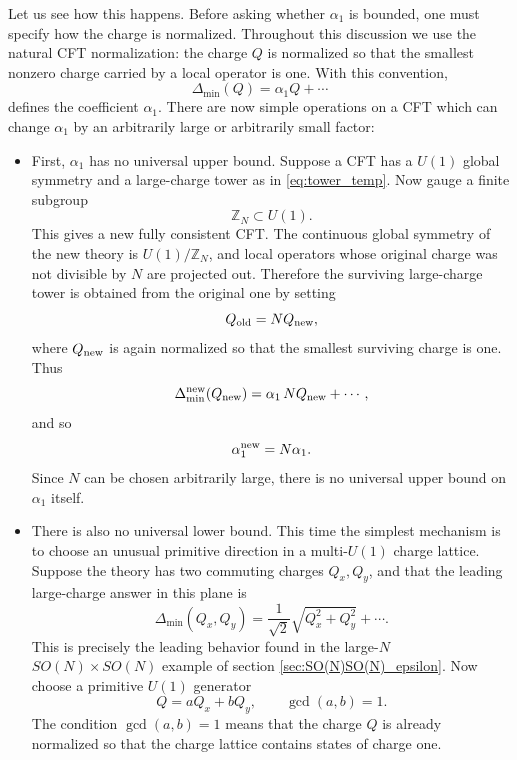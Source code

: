 \documentclass[a4paper,11pt]{article}
\begin{document}
Let us see how this happens. Before asking whether $\alpha_1$ is bounded, one must specify how the charge
is normalized. Throughout this discussion we use the natural CFT normalization: the charge $Q$ is normalized so that the smallest nonzero charge carried by a local operator is one. With this convention,
\begin{equation}\label{eq:tower_temp}
  \Delta_{\min}(Q)=\alpha_1 Q+\cdots
\end{equation}
defines the coefficient $\alpha_1$. There are now simple operations on a CFT which can change $\alpha_1$ by an arbitrarily large or arbitrarily small factor:
\begin{itemize}
    \item First, $\alpha_1$ has no universal upper bound. Suppose a CFT has a $U(1)$
global symmetry and a large-charge tower as in \eqref{eq:tower_temp}. Now gauge a finite subgroup
\begin{equation}
  \mathbb Z_N\subset U(1).
\end{equation}
This gives a new fully consistent CFT. The continuous global symmetry of the new theory is $U(1)/\mathbb Z_N$, and local operators whose original charge was not divisible by $N$ are projected out. Therefore the surviving large-charge tower is obtained from the original one by setting
\begin{equation}
  Q_{\rm old}=N Q_{\rm new},
\end{equation}
where $Q_{\rm new}$ is again normalized so that the smallest surviving charge
is one. Thus
\begin{equation}
  \Delta_{\min}^{\rm new}(Q_{\rm new}) = \alpha_1\,N Q_{\rm new}+\cdots,
\end{equation}
and so
\begin{equation}
  \alpha_1^{\rm new}=N\alpha_1.
\end{equation}
Since $N$ can be chosen arbitrarily large, there is no universal upper bound on $\alpha_1$ itself.
\item There is also no universal lower bound. This time the simplest mechanism is to choose an unusual primitive direction in a multi-$U(1)$ charge lattice. Suppose the theory has two commuting charges $Q_x,Q_y$, and that the leading large-charge answer in this plane is
\begin{equation}
  \Delta_{\min}(Q_x,Q_y) = \frac{1}{\sqrt2}\sqrt{Q_x^2+Q_y^2}+\cdots . \label{eq:alpha1-two-charge-example}
\end{equation}
This is precisely the leading behavior found in the large-$N$ $SO(N)\times SO(N)$ example of section \ref{sec:SO(N)SO(N)_epsilon}. Now choose a primitive $U(1)$ generator
\begin{equation}
  Q=aQ_x+bQ_y, \qquad \gcd(a,b)=1.
\end{equation}
The condition $\gcd(a,b)=1$ means that the charge $Q$ is already normalized so that the charge lattice contains states of charge one.


\end{itemize}
\end{document}
